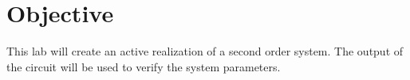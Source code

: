 \section{Objective}\label{sec:objective}
This lab will create an active realization of a second order system.
The output of the circuit will be used to verify the system parameters.
